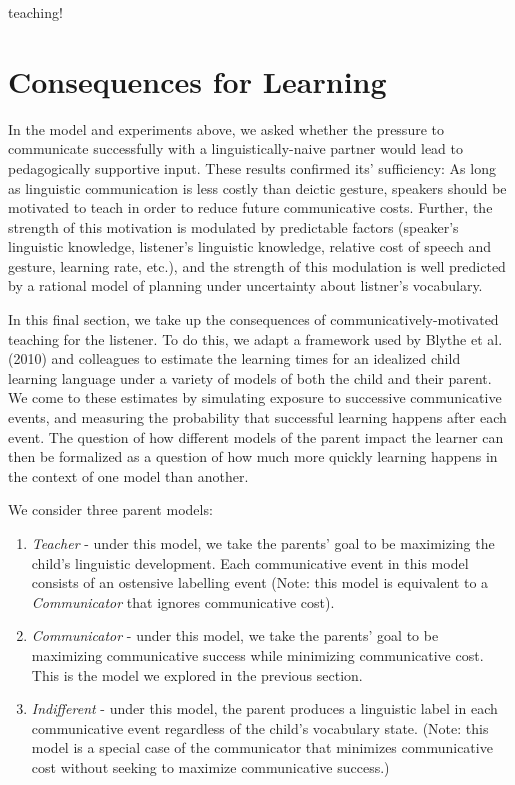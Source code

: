 \documentclass[english,,man,floatsintext]{apa6}
\begin{document}
teaching!

\hypertarget{consequences-for-learning}{%
\section{Consequences for Learning}\label{consequences-for-learning}}

In the model and experiments above, we asked whether the pressure to communicate successfully with a linguistically-naive partner would lead to pedagogically supportive input. These results confirmed its' sufficiency: As long as linguistic communication is less costly than deictic gesture, speakers should be motivated to teach in order to reduce future communicative costs. Further, the strength of this motivation is modulated by predictable factors (speaker's linguistic knowledge, listener's linguistic knowledge, relative cost of speech and gesture, learning rate, etc.), and the strength of this modulation is well predicted by a rational model of planning under uncertainty about listner's vocabulary.

In this final section, we take up the consequences of communicatively-motivated teaching for the listener. To do this, we adapt a framework used by Blythe et al. (2010) and colleagues to estimate the learning times for an idealized child learning language under a variety of models of both the child and their parent. We come to these estimates by simulating exposure to successive communicative events, and measuring the probability that successful learning happens after each event. The question of how different models of the parent impact the learner can then be formalized as a question of how much more quickly learning happens in the context of one model than another.

We consider three parent models:

\begin{enumerate}
\def\labelenumi{\arabic{enumi}.}
\item
  \emph{Teacher} - under this model, we take the parents' goal to be maximizing the child's linguistic development. Each communicative event in this model consists of an ostensive labelling event (Note: this model is equivalent to a \emph{Communicator} that ignores communicative cost).
\item
  \emph{Communicator} - under this model, we take the parents' goal to be maximizing communicative success while minimizing communicative cost. This is the model we explored in the previous section.
\item
  \emph{Indifferent} - under this model, the parent produces a linguistic label in each communicative event regardless of the child's vocabulary state. (Note: this model is a special case of the communicator that minimizes communicative cost without seeking to maximize communicative success.)
\end{enumerate}
\end{document}

